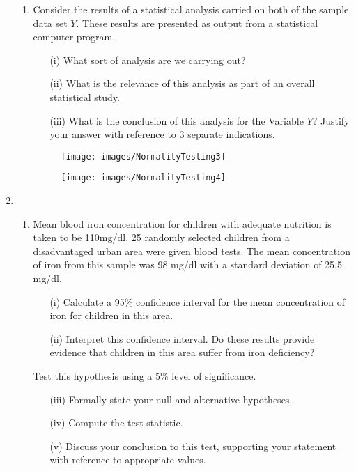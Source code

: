 \documentclass[a4paper,12pt]{article}
\begin{document}
\begin{enumerate}
\begin{enumerate}
\item Consider the results of a statistical analysis carried on both of the sample data set $Y$. These results are presented as output from a statistical computer program.

\begin{itemize}
	\item[(i)]  What sort of analysis are we carrying out? 
	\item[(ii)]  What is the relevance of this analysis as part of an overall statistical study.
	\item[(iii)]  What is the conclusion of this analysis for the Variable $Y$? Justify your answer with reference to 3 separate indications.
\end{itemize}

\begin{figure}[h!]
	\centering
	\texttt{[image: images/NormalityTesting3]}
\end{figure}

\begin{figure}[h!]
	\centering
	\texttt{[image: images/NormalityTesting4]}
\end{figure}
\end{enumerate}

\item
\begin{enumerate}
	\item Mean blood iron concentration for children with adequate nutrition is taken to be 110mg/dl. 25 randomly selected children from a disadvantaged urban area were given blood tests. The mean concentration of iron from this sample was 98 mg/dl with a standard deviation of 25.5 mg/dl. \smallskip
	\begin{itemize}
		\item[(i)]  Calculate a 95\% confidence interval for the mean concentration of iron for children in this area. 
		\item[(ii)] Interpret this confidence interval.  Do these results provide evidence that children in this area suffer from iron deficiency? 
	\end{itemize}
	\medskip
	Test this hypothesis using a 5\% level of significance. 
	
	\begin{itemize}
		\item[(iii)] Formally state your null and alternative hypotheses.
		\item[(iv)] Compute the test statistic.
		\item[(v)] Discuss your conclusion to this test, supporting your statement with reference to appropriate values.
	\end{itemize}
	

\end{enumerate}
\end{enumerate}
\end{document}

